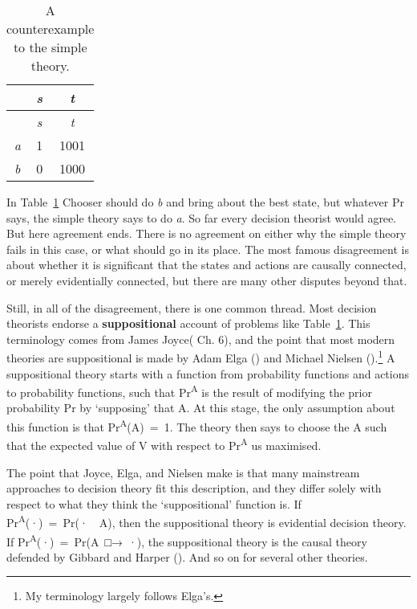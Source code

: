 \documentclass[
  11pt,
  letterpaper,
  DIV=11,
  numbers=noendperiod,
  twoside]{scrartcl}
\begin{document}
\begin{longtable}[]{@{}ccc@{}}
\caption{A counterexample to the simple
theory.}\label{tbl-joycewindow}\tabularnewline
\toprule\noalign{}
& \emph{s} & \emph{t} \\
\midrule\noalign{}
\endfirsthead
\toprule\noalign{}
& \emph{s} & \emph{t} \\
\midrule\noalign{}
\endhead
\bottomrule\noalign{}
\endlastfoot
\emph{a} & 1 & 1001 \\
\emph{b} & 0 & 1000 \\
\end{longtable}

In Table~\ref{tbl-joycewindow} Chooser should do \emph{b} and bring
about the best state, but whatever Pr says, the simple theory says to do
\emph{a}. So far every decision theorist would agree. But here agreement
ends. There is no agreement on either why the simple theory fails in
this case, or what should go in its place. The most famous disagreement
is about whether it is significant that the states and actions are
causally connected, or merely evidentially connected, but there are many
other disputes beyond that.

Still, in all of the disagreement, there is one common thread. Most
decision theorists endorse a \textbf{suppositional} account of problems
like Table~\ref{tbl-joycewindow}. This terminology comes from James
Joyce( Ch. 6), and the point that most
modern theories are suppositional is made by Adam Elga
() and Michael Nielsen
().\footnote{My terminology largely
  follows Elga's.} A suppositional theory starts with a function from
probability functions and actions to probability functions, such that
Pr\textsuperscript{A} is the result of modifying the prior probability
Pr by `supposing' that A. At this stage, the only assumption about this
function is that Pr\textsuperscript{A}(A)~=~1. The theory then says to
choose the A such that the expected value of V with respect to
Pr\textsuperscript{A} us maximised.

The point that Joyce, Elga, and Nielsen make is that many mainstream
approaches to decision theory fit this description, and they differ
solely with respect to what they think the `suppositional' function is.
If Pr\textsuperscript{A}(·)~=~Pr(·~\textbar~A), then the suppositional
theory is evidential decision theory. If
Pr\textsuperscript{A}(·)~=~Pr(A~□→~·), the suppositional theory is the
causal theory defended by Gibbard and Harper
(). And so on for several other
theories.
\end{document}
